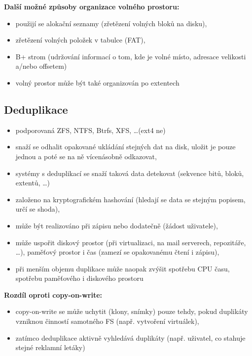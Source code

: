 \documentclass[a4paper, 11pt]{article}
\begin{document}
\textbf{Další možné způsoby organizace volného prostoru:}
\begin{itemize}
    \item použijí se alokační seznamy (zřetězení volných bloků na disku),
    \item zřetězení volných položek v tabulce (FAT),
    \item B+ strom (udržování informací o tom, kde je volné místo, adresace velikosti a/nebo offsetem)
    \item volný prostor může být také organizován po extentech
\end{itemize}

\newpage

\subsection{Deduplikace}
\begin{itemize}
    \item podporovaná ZFS, NTFS, Btrfs, XFS, \ldots (ext4 ne)
    \item snaží se odhalit opakované ukládání stejných dat na disk, uložit je pouze jednou a poté se na ně vícenásobně odkazovat,
    \item systémy s deduplikací se snaží taková data detekovat (sekvence bitů, bloků, extentů, \ldots)
    \item založeno na kryptografickém hashování (hledají se data se stejným popisem, určí se shoda),
    \item může být realizováno při zápisu nebo dodatečně (žádost uživatele),
    \item může uspořit diskový prostor (při virtualizaci, na mail serverech, repozitáře, \ldots), paměťový prostor i čas (zamezí se opakovanému čtení i zápisu),
    \item při menším objemu duplikace může naopak zvýšit spotřebu CPU času, spotřebu paměťového i diskového prostoru
\end{itemize}
 
\textbf{Rozdíl oproti copy-on-write:}
\begin{itemize}
    \item copy-on-write se může uchytit (klony, snímky) pouze tehdy, pokud duplikáty vzniknou činností samotného FS (např. vytvoření virtuálek),
    \item zatímco deduplikace aktivně vyhledává duplikáty (např. uživatel, co stahuje stejné reklamní letáky)
\end{itemize}
\end{document}
